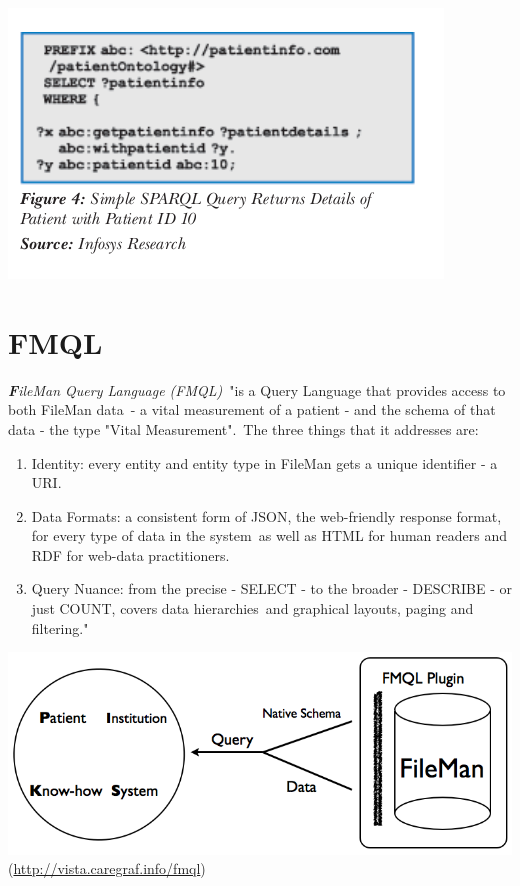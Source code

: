 \documentclass[DIV=calc, paper=a4, fontsize=12pt, onecolumn]{scrartcl}	 %
\newcommand{\initial}[1]{ %
\lettrine[lines=3,lhang=0.3,nindent=0em,slope=0em]{
\color{DarkBlue}
{\textbf{\textit{#1}}}}{}}
\begin{document}
		  \includegraphics[scale=0.5]{sparqlh.png}
 		  \citep{parachuri2008role}
 		

		


\section[FileMan Query Language (FMQL)]{FMQL}
  \label{sec:fmql}

\initial{F}\textit{ileMan Query Language (FMQL)}\
"is a Query Language that provides access to both FileMan data\
- a vital measurement of a patient - and the schema of that data - the type "Vital Measurement".\
The three things that it addresses are:
\begin{enumerate}
\item
Identity: every entity and entity type in FileMan gets a unique identifier - a URI.
\item
Data Formats: a consistent form of JSON, the web-friendly response format, for every type of data in the system\
 as well as HTML for human readers and RDF for web-data practitioners.
\item
Query Nuance: from the precise - SELECT - to the broader - DESCRIBE - or just COUNT, covers data hierarchies\
 and graphical layouts, paging and filtering."
\end{enumerate}
\includegraphics[scale=0.4]{fmqlFromFileMan.png}\\
(\url{http://vista.caregraf.info/fmql})\
\end{document}
